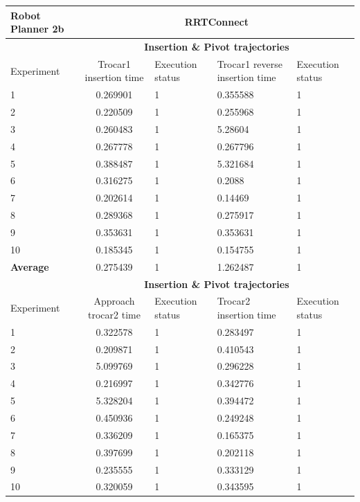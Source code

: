 \begin{longtable}{|p{2cm}|c|p{2cm}|p{2cm}|p{2cm}|}
\hline
Robot Planner 2b           & \multicolumn{4}{c}{\textbf{RRTConnect}}                                                                                                 \vline \\
\hline
                          & \multicolumn{4}{c}{\textbf{Insertion \& Pivot trajectories}}                     \vline \\
\hline
Experiment                & Trocar1 insertion time & Execution status & Trocar1 reverse insertion time & Execution status  \\
\hline
1	& 0.269901	& 1	& 0.355588	& 1 \\
2	& 0.220509	& 1	& 0.255968	& 1 \\
3	& 0.260483	& 1	& 5.28604	& 1 \\
4	& 0.267778	& 1	& 0.267796	& 1 \\
5	& 0.388487	& 1	& 5.321684	& 1 \\
6	& 0.316275	& 1	& 0.2088	& 1 \\
7	& 0.202614	& 1	& 0.14469	& 1 \\
8	& 0.289368	& 1	& 0.275917	& 1 \\
9	& 0.353631	& 1	& 0.353631	& 1 \\
10	& 0.185345	& 1	& 0.154755	& 1 \\
\hline
\textbf{Average} & 0.275439 &	1	& 1.262487	& 1 \\
\hline
                          & \multicolumn{4}{c}{\textbf{Insertion \& Pivot trajectories}}                     \vline \\
\hline
Experiment                & Approach trocar2 time & Execution status & Trocar2 insertion time & Execution status  \\
\hline
1 & 0.322578	& 1	& 0.283497	& 1 \\
2 & 0.209871	& 1	& 0.410543	& 1 \\
3 & 5.099769	& 1	& 0.296228	& 1 \\
4 & 0.216997	& 1	& 0.342776	& 1 \\
5 & 5.328204	& 1	& 0.394472	& 1 \\
6 & 0.450936	& 1	& 0.249248	& 1 \\
7 & 0.336209	& 1	& 0.165375	& 1 \\
8 & 0.397699	& 1	& 0.202118	& 1 \\
9 & 0.235555	& 1	& 0.333129	& 1 \\
10  & 0.320059	& 1	& 0.343595	& 1 \\

\end{longtable}
